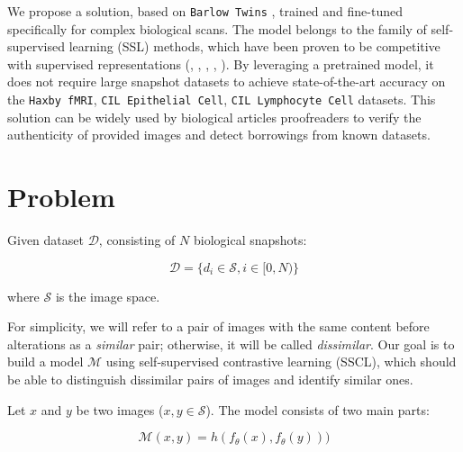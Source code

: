 \documentclass{article}
\begin{document}
We propose a solution, based on \texttt{Barlow Twins} \cite{zbontar2021barlow},
trained and fine-tuned specifically for complex biological scans. 
The model belongs to the family of self-supervised learning (SSL) 
methods, which have been proven to be competitive with supervised representations 
(\cite{chen2020simclr}, \cite{radford2021clip}, \cite{zbontar2021barlow}, \cite{melekhov2016}, 
\cite{grill2020approach_ssl}). By leveraging a pretrained model, 
it does not require large snapshot datasets to achieve state-of-the-art accuracy 
on the \texttt{Haxby fMRI}, \texttt{CIL Epithelial Cell}, 
\texttt{CIL Lymphocyte Cell} datasets. This solution can be widely used by 
biological articles proofreaders to verify the authenticity of provided images and 
detect borrowings from known datasets. 



\section{Problem}\label{sec:problem}

Given dataset $\mathcal{D}$, consisting of $N$ biological snapshots: 

$$ \mathcal{D} = \{d_i \in \mathcal{S}, i \in [0, N)\} $$

where $\mathcal{S}$ is the image space. 

For simplicity, we will refer to a pair of images with the same content 
before alterations as a \textit{similar} pair; otherwise, it will be called \textit{dissimilar}.
Our goal is to build a model $\mathcal{M}$ using self-supervised contrastive learning (SSCL), 
which should be able to distinguish dissimilar pairs of images and identify similar ones. 

Let $x$ and $y$ be two images ($x, y \in \mathcal{S}$).
The model consists of two main parts:

$$ \mathcal{M}(x, y) = h(f_{\theta}(x), f_{\theta}(y))) $$
\end{document}
